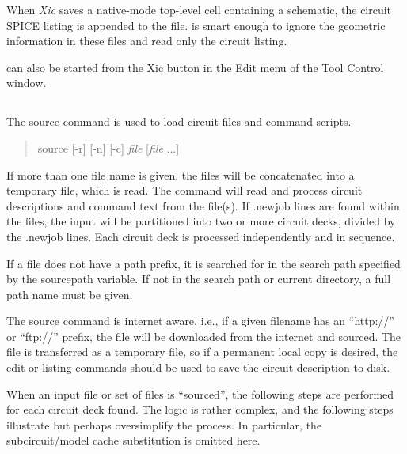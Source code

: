 When {\it Xic} saves a native-mode top-level cell containing a
schematic, the circuit SPICE listing is appended to the file. 
{\WRspice} is smart enough to ignore the geometric information in
these files and read only the circuit listing.

{\Xic} can also be started from the {\cb Xic} button in the {\cb Edit}
menu of the {\cb Tool Control} window.

\subsection{}


The {\cb source} command is used to load circuit files and command
scripts.
\begin{quote}\vt
source [{\vt -r}] [{\vt -n}] [{\vt -c}] {\it file} [{\it file} ...]
\end{quote}
If more than one file name is given, the files will be concatenated
into a temporary file, which is read.  The command will read and
process circuit descriptions and command text from the file(s).  If
{\vt .newjob} lines are found within the files, the input will be
partitioned into two or more circuit decks, divided by the {\vt
.newjob} lines.  Each circuit deck is processed independently and in
sequence.

If a file does not have a path prefix, it is searched for in the
search path specified by the {\et sourcepath} variable.  If not in the
search path or current directory, a full path name must be given.

The {\cb source} command is internet aware, i.e., if a given filename
has an ``{\vt http://}'' or ``{\vt ftp://}'' prefix, the file will be
downloaded from the internet and sourced.  The file is transferred as
a temporary file, so if a permanent local copy is desired, the {\cb
edit} or {\cb listing} commands should be used to save the circuit
description to disk. 

When an input file or set of files is ``sourced'', the following steps
are performed for each circuit deck found.  The logic is rather
complex, and the following steps illustrate but perhaps oversimplify
the process.  In particular, the subcircuit/model cache substitution
is omitted here.

